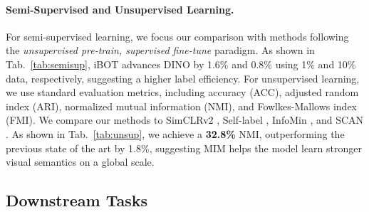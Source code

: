 \documentclass{article} \usepackage{iclr2022_conference,times}
\def\ourmethod{{iBOT}\xspace}
\begin{document}
\paragraph{Semi-Supervised and Unsupervised Learning.} 
For semi-supervised learning, we focus our comparison with methods 
following the \textit{unsupervised pre-train, supervised fine-tune} paradigm.
As shown in Tab.~\ref{tab:semisup}, \ourmethod advances DINO by 1.6\% and 0.8\% using 1\% and 10\% data, respectively, suggesting a higher label efficiency.
For unsupervised learning, we use standard evaluation metrics, including accuracy (ACC), adjusted random index (ARI), normalized mutual information (NMI), and Fowlkes-Mallows index (FMI). 
We compare our methods to SimCLRv2 \citep{simclrv2}, Self-label \citep{self-label}, InfoMin \citep{infomin}, and SCAN \citep{scan}.
As shown in Tab.~\ref{tab:unsup}, we achieve a \textbf{32.8\%} NMI, outperforming the previous state of the art by 1.8\%, suggesting MIM helps the model learn stronger visual semantics on a global scale.

\subsection{Downstream Tasks}
\label{sec:downstream}
\end{document}
